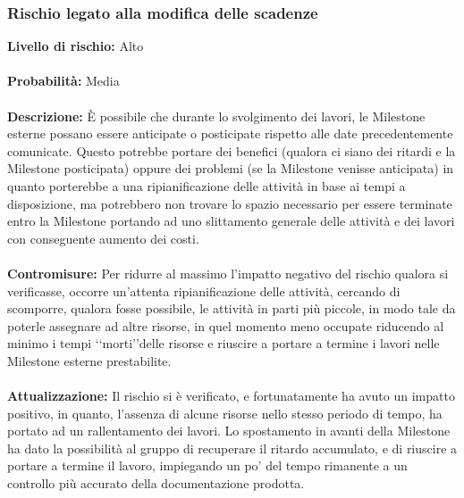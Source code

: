 	\subsubsection{Rischio legato alla modifica delle scadenze}
	\label{modificaScadenze}
	\textbf{Livello di rischio:} Alto
	\\ \\
	\textbf{Probabilità:} Media
	\\ \\
	\textbf{Descrizione:} È possibile che durante lo svolgimento dei lavori, le Milestone\g{} esterne possano essere anticipate o posticipate rispetto alle date precedentemente comunicate. Questo potrebbe portare dei benefici (qualora ci siano dei ritardi e la Milestone\g{} posticipata) oppure  dei problemi (se la Milestone\g{} venisse anticipata) in quanto porterebbe a una ripianificazione delle attività in base ai tempi a disposizione, ma potrebbero non trovare lo spazio necessario per essere terminate entro la Milestone\g{} portando ad uno slittamento generale delle attività e dei lavori con conseguente aumento dei costi.
	\\ \\
	\textbf{Contromisure:} Per ridurre al massimo l'impatto negativo del rischio qualora si verificasse, occorre un'attenta ripianificazione delle attività, cercando di scomporre, qualora fosse possibile, le attività in parti più piccole, in modo tale da poterle assegnare ad altre risorse, in quel momento meno occupate riducendo al minimo i tempi \lq\lq{}morti\rq \rq delle risorse e riuscire a portare a termine i lavori nelle Milestone\g{} esterne prestabilite.
	\\ \\
	\textbf{Attualizzazione:} Il rischio si è verificato, e fortunatamente ha avuto un impatto positivo, in quanto, l'assenza di alcune risorse nello stesso periodo di tempo, ha portato ad un rallentamento dei lavori. Lo spostamento in avanti della Milestone\g{} ha dato la possibilità al gruppo di recuperare il ritardo accumulato, e di riuscire a portare a termine il lavoro, impiegando un po' del tempo rimanente a un controllo più accurato della documentazione prodotta.
	

